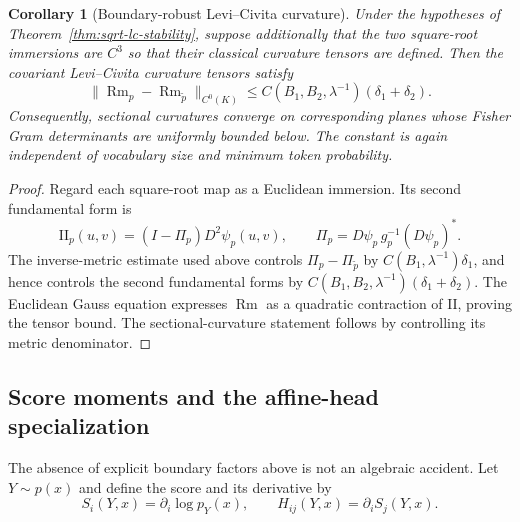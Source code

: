 \documentclass[11pt]{article}
\newtheorem{corollary}[theorem]{Corollary}
\theoremstyle{definition}
\theoremstyle{remark}
\begin{document}
\begin{corollary}[Boundary-robust Levi--Civita curvature]\label{cor:sqrt-lc-curvature}
Under the hypotheses of Theorem~\ref{thm:sqrt-lc-stability}, suppose additionally that the two square-root immersions are $C^3$ so that their classical curvature tensors are defined. Then the covariant Levi--Civita curvature tensors satisfy
\begin{equation}
    \|\operatorname{Rm}_p-\operatorname{Rm}_{\widetilde p}\|_{C^0(K)}
    \le C(B_1,B_2,\lambda^{-1})(\delta_1+\delta_2).
\end{equation}
Consequently, sectional curvatures converge on corresponding planes whose Fisher Gram determinants are uniformly bounded below. The constant is again independent of vocabulary size and minimum token probability.
\end{corollary}

\begin{proof}
Regard each square-root map as a Euclidean immersion. Its second fundamental form is
\begin{equation}
    \mathrm{II}_p(u,v)
    =(I-\Pi_p)D^2\psi_p(u,v),
    \qquad
    \Pi_p=D\psi_p\,g_p^{-1}(D\psi_p)^*.
\end{equation}
The inverse-metric estimate used above controls $\Pi_p-\Pi_{\widetilde p}$ by $C(B_1,\lambda^{-1})\delta_1$, and hence controls the second fundamental forms by $C(B_1,B_2,\lambda^{-1})(\delta_1+\delta_2)$. The Euclidean Gauss equation expresses $\operatorname{Rm}$ as a quadratic contraction of $\mathrm{II}$, proving the tensor bound. The sectional-curvature statement follows by controlling its metric denominator.
\end{proof}

\subsection{Score moments and the affine-head specialization}

The absence of explicit boundary factors above is not an algebraic accident. Let $Y\sim p(x)$ and define the score and its derivative by
\begin{equation}
    S_i(Y,x)=\partial_i\log p_Y(x),
    \qquad H_{ij}(Y,x)=\partial_iS_j(Y,x).
\end{equation}
\end{document}
